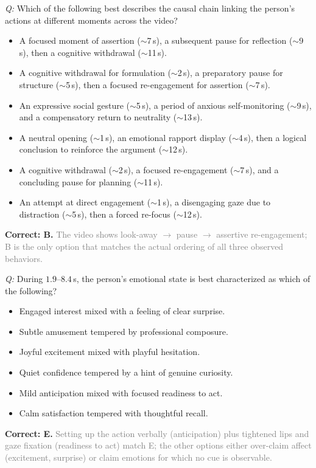 \documentclass{article}
\begin{document}
\begin{examplebox}[title={(3) Temporal-Causal Reasoning}]
\emph{Q:} Which of the following best describes the causal chain linking the person's actions at different moments across the video?
\begin{itemize}[leftmargin=1.4em, itemsep=0pt, topsep=1pt, parsep=0pt]
\item[A.] A focused moment of assertion ($\sim$7\,s), a subsequent pause for reflection ($\sim$9\,s), then a cognitive withdrawal ($\sim$11\,s).
\item[B.] A cognitive withdrawal for formulation ($\sim$2\,s), a preparatory pause for structure ($\sim$5\,s), then a focused re-engagement for assertion ($\sim$7\,s).
\item[C.] An expressive social gesture ($\sim$5\,s), a period of anxious self-monitoring ($\sim$9\,s), and a compensatory return to neutrality ($\sim$13\,s).
\item[D.] A neutral opening ($\sim$1\,s), an emotional rapport display ($\sim$4\,s), then a logical conclusion to reinforce the argument ($\sim$12\,s).
\item[E.] A cognitive withdrawal ($\sim$2\,s), a focused re-engagement ($\sim$7\,s), and a concluding pause for planning ($\sim$11\,s).
\item[F.] An attempt at direct engagement ($\sim$1\,s), a disengaging gaze due to distraction ($\sim$5\,s), then a forced re-focus ($\sim$12\,s).
\end{itemize}
\textcolor{humanc}{\textbf{Correct: B.}} \textcolor{gray}{ The video shows look-away $\to$ pause $\to$ assertive re-engagement; B is the only option that matches the actual ordering of all three observed behaviors.}

\end{examplebox}
\begin{examplebox}[title={(4) Mixed Emotion Discrimination}]
\emph{Q:} During $1.9$--$8.4$\,s, the person's emotional state is best characterized as which of the following?
\begin{itemize}[leftmargin=1.4em, itemsep=0pt, topsep=1pt, parsep=0pt]
\item[A.] Engaged interest mixed with a feeling of clear surprise.
\item[B.] Subtle amusement tempered by professional composure.
\item[C.] Joyful excitement mixed with playful hesitation.
\item[D.] Quiet confidence tempered by a hint of genuine curiosity.
\item[E.] Mild anticipation mixed with focused readiness to act.
\item[F.] Calm satisfaction tempered with thoughtful recall.
\end{itemize}
\textcolor{humanc}{\textbf{Correct: E.}} \textcolor{gray}{ Setting up the action verbally (anticipation) plus tightened lips and gaze fixation (readiness to act) match E; the other options either over-claim affect (excitement, surprise) or claim emotions for which no cue is observable.}

\end{examplebox}
\end{document}
